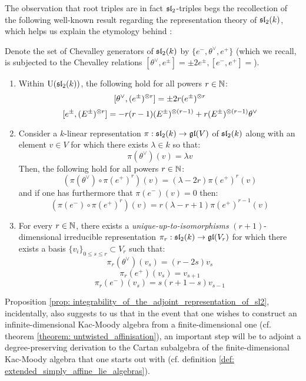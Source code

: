             The observation that root triples are in fact $\sl_2$-triples begs the recollection of the following well-known result regarding the representation theory of $\sl_2(k)$, which helps us explain the etymology behind :
            \begin{proposition} \label{prop: integrability_of_the_adjoint_representation_of_sl2}
                \cite[Proposition 4.2.6]{perrin_kac_moody_algebras} Denote the set of Chevalley generators of $\sl_2(k)$ by $\{e^-, \theta^{\vee}, e^+\}$ (which we recall, is subjected to the Chevalley relations $[\theta^{\vee}, e^{\pm}] = \pm 2 e^{\pm}, [e^-, e^+] = $). 
                    \begin{enumerate}
                        \item Within $\rmU(\sl_2(k))$, the following hold for all powers $r \in \N$:
                            $$[\theta^{\vee}, (e^{\pm})^{\tensor r}] = \pm 2r (e^{\pm})^{\tensor r}$$
                            $$[e^{\pm}, (E^{\pm})^{\tensor r}] = -r(r - 1) (E^{\pm})^{\tensor (r - 1)} + r (E^{\pm})^{\tensor (r - 1)} \theta^{\vee}$$
                        \item Consider a $k$-linear representation $\pi: \sl_2(k) \to \gl(V)$ of $\sl_2(k)$ along with an element $v \in V$ for which there exists $\lambda \in k$ so that:
                            $$\pi(\theta^{\vee})(v) = \lambda v$$
                        Then, the following hold for all powers $r \in \N$:
                            $$( \pi(\theta^{\vee}) \circ \pi(e^+)^r )(v) = (\lambda - 2r)\pi(e^+)^r(v)$$
                        and if one has furthermore that $\pi(e^-)(v) = 0$ then:
                            $$( \pi(e^-) \circ \pi(e^+)^r )(v) = r(\lambda - r + 1) \pi(e^+)^{r - 1}(v)$$
                        \item For every $r \in \N$, there exists a \textit{unique-up-to-isomorphisms} $(r + 1)$-dimensional irreducible representation $\pi_r: \sl_2(k) \to \gl(V_r)$ for which there exists a basis $\{v_i\}_{0 \leq s \leq r} \subset V_r$ such that:
                            $$\pi_r(\theta^{\vee})(v_s) = (r - 2s) v_s$$
                            $$\pi_r(e^+)(v_s) = v_{s + 1}$$
                            $$\pi_r(e^-)(v_s) = s(r + 1 - s) v_{s - 1}$$
                    \end{enumerate}
            \end{proposition}
            \begin{remark}
                Proposition \ref{prop: integrability_of_the_adjoint_representation_of_sl2}, incidentally, also suggests to us that in the event that one wishes to construct an infinite-dimensional Kac-Moody algebra from a finite-dimensional one (cf. theorem \ref{theorem: untwisted_affinisation}), an important step will be to adjoint a degree-preserving derivation to the Cartan subalgebra of the finite-dimensional Kac-Moody algebra that one starts out with (cf. definition \ref{def: extended_simply_affine_lie_algebras}).
            \end{remark}
